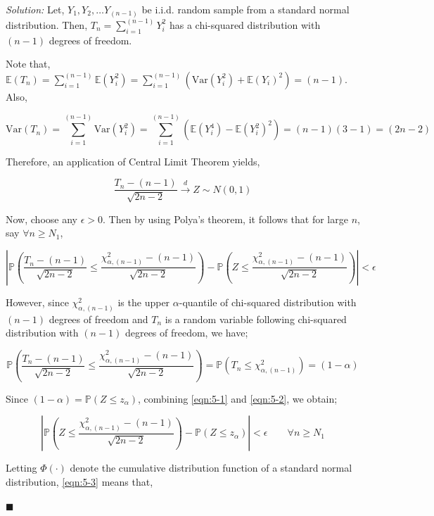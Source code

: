 \documentclass[12pt]{article}
\newcommand{\E}{\mathbb{E}}
\newcommand{\Var}{\text{Var}}
\newcommand{\prob}{\mathbb{P}}
\theoremstyle{definition}
\newenvironment{answer}{\textit{Solution: }\quad }{ \hfill $\blacksquare$}
\numberwithin{equation}{section}
\begin{document}
\begin{answer}
    Let, $Y_1, Y_2, \dots Y_{(n-1)}$ be i.i.d. random sample from a standard normal distribution. Then, $T_n = \sum_{i=1}^{(n-1)}Y_i^2$ has a chi-squared distribution with $(n-1)$ degrees of freedom.

    Note that, $\E(T_n) = \sum_{i=1}^{(n-1)} \E(Y_i^2) = \sum_{i=1}^{(n-1)} (\Var(Y_i^2) + \E(Y_i)^2) = (n-1)$. Also, 

    $$
    \Var(T_n) = \sum_{i=1}^{(n-1)} \Var(Y_i^2) = \sum_{i=1}^{(n-1)} (\E(Y_i^4) - \E(Y_i^2)^2) = (n-1)(3-1) = (2n-2)
    $$

    Therefore, an application of Central Limit Theorem yields,

    $$\dfrac{T_n - (n-1)}{\sqrt{2n - 2}} \xrightarrow{d} Z \sim N(0, 1)$$

    Now, choose any $\epsilon > 0$. Then by using Polya’s theorem, it follows that for large $n$, say $\forall n \geq N_1$, 

    \begin{equation}
        \left\vert \prob\left( \dfrac{T_n - (n-1)}{\sqrt{2n - 2}} \leq \dfrac{\chi^2_{\alpha, (n-1)} - (n-1)}{\sqrt{2n - 2}} \right) - \prob\left( Z \leq \dfrac{\chi^2_{\alpha, (n-1)} - (n-1)}{\sqrt{2n - 2}} \right) \right\vert < \epsilon
        \label{eqn:5-1}        
    \end{equation}

    However, since $\chi^2_{\alpha, (n-1)}$ is the upper $\alpha$-quantile of chi-squared distribution with $(n-1)$ degrees of freedom and $T_n$ is a random variable following chi-squared distribution with $(n-1)$ degrees of freedom, we have;

    \begin{equation}
        \prob\left( \dfrac{T_n - (n-1)}{\sqrt{2n - 2}} \leq \dfrac{\chi^2_{\alpha, (n-1)} - (n-1)}{\sqrt{2n - 2}} \right) = \prob(T_n \leq \chi^2_{\alpha, (n-1)}) = (1-\alpha)
        \label{eqn:5-2}
    \end{equation}

    Since $(1 - \alpha) = \prob(Z \leq z_\alpha)$, combining \cref{eqn:5-1} and \cref{eqn:5-2}, we obtain;

    \begin{equation}
        \left\vert \prob\left( Z \leq \dfrac{\chi^2_{\alpha, (n-1)} - (n-1)}{\sqrt{2n - 2}} \right) -\prob(Z \leq z_\alpha) \right\vert < \epsilon \qquad \forall n \geq N_1
        \label{eqn:5-3}
    \end{equation}

    Letting $\Phi(\cdot)$ denote the cumulative distribution function of a standard normal distribution, \cref{eqn:5-3} means that,


\end{answer}
\end{document}

